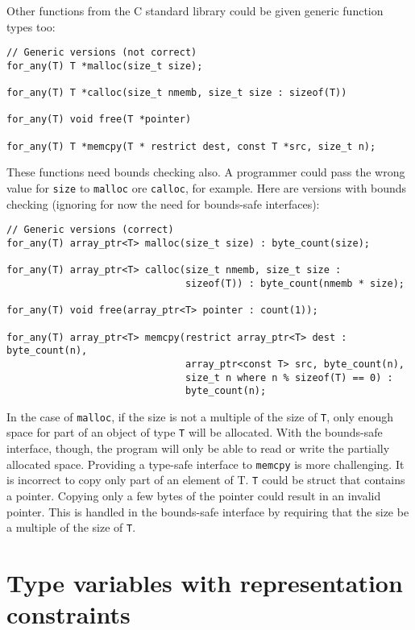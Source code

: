 Other functions from the C standard library could be given generic function types too:
\begin{lstlisting}
// Generic versions (not correct)
for_any(T) T *malloc(size_t size);

for_any(T) T *calloc(size_t nmemb, size_t size : sizeof(T))

for_any(T) void free(T *pointer)

for_any(T) T *memcpy(T * restrict dest, const T *src, size_t n);
\end{lstlisting}
These functions need bounds checking also.  A programmer
could pass the wrong value for \lstinline+size+ to \lstinline+malloc+
ore \lstinline+calloc+, for example.  Here are
versions with bounds checking (ignoring for now the need for bounds-safe interfaces):
\begin{lstlisting}
// Generic versions (correct)
for_any(T) array_ptr<T> malloc(size_t size) : byte_count(size);

for_any(T) array_ptr<T> calloc(size_t nmemb, size_t size : 
                               sizeof(T)) : byte_count(nmemb * size);

for_any(T) void free(array_ptr<T> pointer : count(1));

for_any(T) array_ptr<T> memcpy(restrict array_ptr<T> dest : byte_count(n),
                               array_ptr<const T> src, byte_count(n),
                               size_t n where n % sizeof(T) == 0) :
                               byte_count(n);
\end{lstlisting}
In the case of \lstinline+malloc+, if the size is not a multiple of the size of \lstinline+T+,
only enough space for part of an object of type \lstinline+T+ will be allocated.  With the 
bounds-safe interface, though, the program will only be able to read or write the 
partially allocated space.   Providing a type-safe interface to \lstinline+memcpy+
is more challenging.   It is incorrect to copy only part of an element of T.
\lstinline+T+ could be struct that contains a pointer.  Copying only a few bytes
of the pointer could result in an invalid pointer.
This is handled in the bounds-safe interface by requiring that the
size be a multiple of the size of \lstinline+T+.

\section{Type variables with representation constraints}

